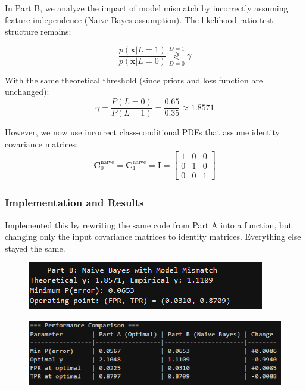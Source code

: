 \documentclass[12pt]{article}
\begin{document}
In Part B, we analyze the impact of model mismatch by incorrectly assuming feature independence (Naive Bayes assumption). The likelihood ratio test structure remains:

\begin{equation}
\frac{p(\mathbf{x}|L=1)}{p(\mathbf{x}|L=0)} \stackrel{D=1}{\underset{D=0}{\gtrless}} \gamma
\end{equation}

With the same theoretical threshold (since priors and loss function are unchanged):
\begin{equation}
\gamma = \frac{P(L=0)}{P(L=1)} = \frac{0.65}{0.35} \approx 1.8571
\end{equation}

However, we now use incorrect class-conditional PDFs that assume identity covariance matrices:
\begin{align}
\mathbf{C}_0^{\text{naive}} = \mathbf{C}_1^{\text{naive}} = \mathbf{I} = \begin{bmatrix} 1 & 0 & 0 \\ 0 & 1 & 0 \\ 0 & 0 & 1 \end{bmatrix}
\end{align}


\subsubsection{Implementation and Results}

Implemented this by rewriting the same code from Part A into a function, but changing only the input covariance matrices to identity matrices. Everything else stayed the same.

\begin{figure}[H]
    \centering
    \includegraphics[width=0.5\linewidth]{resultB.png}
\end{figure}
\begin{figure}[H]
    \centering
    \includegraphics[width=0.65\linewidth]{AB_Comparison.png}
\end{figure}
\end{document}
